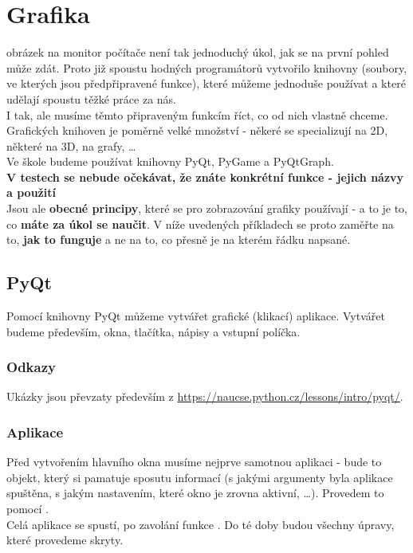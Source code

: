 \section{Grafika}
 obrázek na monitor počítače není tak jednoduchý úkol, jak se na první pohled může zdát. Proto již spoustu hodných programátorů vytvořilo knihovny (soubory, ve kterých jsou předpřipravené funkce), které můžeme jednoduše používat a které udělají spoustu těžké práce za nás.\\
I tak, ale musíme těmto připraveným funkcím říct, co od nich vlastně chceme.\\
Grafických knihoven je poměrně velké množství - někeré se specializují na 2D, některé na 3D, na grafy, \dots \\
Ve škole budeme používat knihovny PyQt, PyGame a PyQtGraph.\\

\vspace{.5cm}
\textbf{V testech se nebude očekávat, že znáte konkrétní funkce - jejich názvy a použití}\\
Jsou ale \textbf{obecné principy}, které se pro zobrazování grafiky používají - a to je to, co \textbf{máte za úkol se naučit}. V níže uvedených příkladech se proto zaměřte na to, \textbf{jak to funguje} a ne na to, co přesně je na kterém řádku napsané.\\
\subsection{PyQt}
Pomocí knihovny PyQt můžeme vytvářet grafické (klikací) aplikace. Vytvářet budeme především, okna, tlačítka, nápisy a vstupní políčka.
\subsubsection{Odkazy}
Ukázky jsou převzaty především z \url{https://naucse.python.cz/lessons/intro/pyqt/}.

\subsubsection{Aplikace}
Před vytvořením hlavního okna musíme nejprve  samotnou aplikaci - bude to objekt, který si pamatuje sposutu informací (s jakými argumenty byla aplikace spuštěna, s jakým nastavením, které okno je zrovna aktivní, \dots). Provedem to pomocí .\\
Celá aplikace se spustí, po zavolání funkce . Do té doby budou všechny úpravy, které provedeme skryty.
